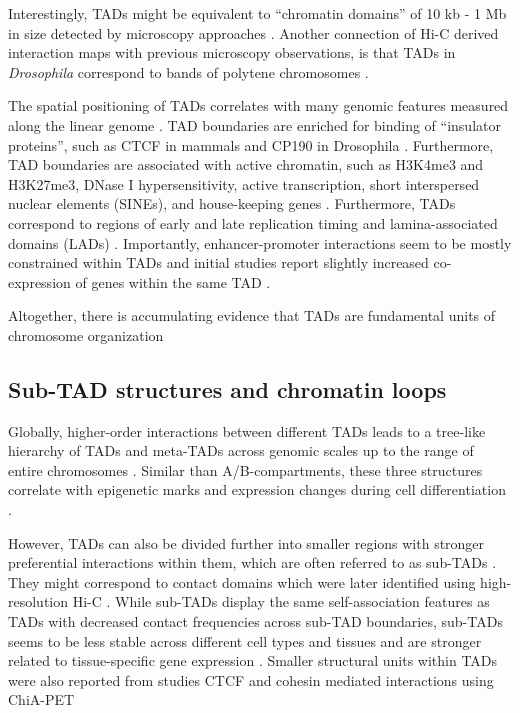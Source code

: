 \documentclass[a4paper,twoside=true,openright,parskip=full,chapterprefix=true,11pt,headings=normal,bibliography=totoc,listof=totoc,titlepage=on,captions=tableabove,draft=false]{scrreprt}
\theoremstyle{definition}
\theoremstyle{definition}
\theoremstyle{definition}
\theoremstyle{remark}
\begin{document}
Interestingly, TADs might be equivalent to ``chromatin domains'' of 10
kb - 1 Mb in size detected by microscopy approaches
\citep{Cremer2010, Gibcus2013}. Another connection of Hi-C derived
interaction maps with previous microscopy observations, is that TADs in
\emph{Drosophila} correspond to bands of polytene chromosomes
\citep{Eagen2015}.

The spatial positioning of TADs correlates with many genomic features
measured along the linear genome \citep{Merkenschlager2016}. TAD
boundaries are enriched for binding of ``insulator proteins'', such as
CTCF in mammals and CP190 in Drosophila \citep{Dixon2012, Sexton2012}.
Furthermore, TAD boundaries are associated with active chromatin, such
as H3K4me3 and H3K27me3, DNase I hypersensitivity, active transcription,
short interspersed nuclear elements (SINEs), and house-keeping genes
\citep{Dixon2012}. Furthermore, TADs correspond to regions of early and
late replication timing \citep{Pope2014, Dileep2015} and
lamina-associated domains (LADs) \citep{Dixon2012}. Importantly,
enhancer-promoter interactions seem to be mostly constrained within TADs
\citep{Shen2012, Ghavi-helm2014, Symmons2014} and initial studies report
slightly increased co-expression of genes within the same TAD
\citep{Nora2012}.

Altogether, there is accumulating evidence that TADs are fundamental
units of chromosome organization \citep{Dixon2016}

\hypertarget{sub-tad-structures-and-chromatin-loops}{%
\subsection{Sub-TAD structures and chromatin
loops}\label{sub-tad-structures-and-chromatin-loops}}

Globally, higher-order interactions between different TADs leads to a
tree-like hierarchy of TADs and meta-TADs across genomic scales up to
the range of entire chromosomes \citep{Fraser2015}. Similar than
A/B-compartments, these three structures correlate with epigenetic marks
and expression changes during cell differentiation \citep{Fraser2015}.

However, TADs can also be divided further into smaller regions with
stronger preferential interactions within them, which are often referred
to as sub-TADs \citep{Phillips-Cremins2013}. They might correspond to
contact domains which were later identified using high-resolution Hi-C
\citep{Rao2014}. While sub-TADs display the same self-association
features as TADs with decreased contact frequencies across sub-TAD
boundaries, sub-TADs seems to be less stable across different cell types
and tissues and are stronger related to tissue-specific gene expression
\citep{Berlivet2013, Phillips-Cremins2013}. Smaller structural units
within TADs were also reported from studies CTCF and cohesin mediated
interactions using ChiA-PET \citep{Dowen2014, Hnisz2016a}
\end{document}
